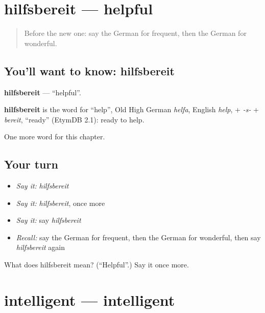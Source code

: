 \section[hilfsbereit]{hilfsbereit — helpful}

\label{lesson:GE-C216-hilfsbereit}



\begin{quote}
Before the new one: say the German for frequent, then the German for wonderful.
\end{quote}

\subsection*{You'll want to know: hilfsbereit}
\textbf{hilfsbereit} — \textquotedblleft{}helpful\textquotedblright{}.

\begin{cousinweb}
\textbf{hilfsbereit} is the word for \textquotedblleft{}help\textquotedblright{}, Old High German \emph{helfa}, English \emph{help}, + \emph{-s-} + \emph{bereit}, \textquotedblleft{}ready\textquotedblright{} (EtymDB 2.1): ready to help.
\end{cousinweb}

\begin{grammarlens}[title={What you've built}]
One more word for this chapter.
\end{grammarlens}

\subsection*{Your turn}
\begin{itemize}
\raggedright
  \item \emph{Say it:} \emph{hilfsbereit}
  \item \emph{Say it:} \emph{hilfsbereit}, once more
  \item \emph{Say it:} say \emph{hilfsbereit}
  \item \emph{Recall:} say the German for frequent, then the German for wonderful, then say \emph{hilfsbereit} again
\end{itemize}

\begin{tcolorbox}[breakable,colback=teal!4,colframe=teal!35!black,title={Before you move on}]
What does hilfsbereit mean? (\textquotedblleft{}Helpful\textquotedblright{}.) Say it once more.
\end{tcolorbox}
\section[intelligent]{intelligent — intelligent}

